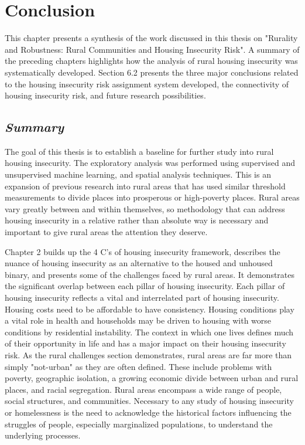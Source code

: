 \chapter{Conclusion}	%

This chapter presents a synthesis of the work discussed in this thesis on "Rurality and Robustness: Rural Communities and Housing Insecurity Risk". A summary of the preceding chapters highlights how the analysis of rural housing insecurity was systematically developed. Section 6.2 presents the three major conclusions related to the housing insecurity risk assignment system developed, the connectivity of housing insecurity risk, and future research possibilities. 

\section{\textit{Summary}}

The goal of this thesis is to establish a baseline for further study into rural housing insecurity. The exploratory analysis was performed using supervised and unsupervised machine learning, and spatial analysis techniques. This is an expansion of previous research into rural areas that has used similar threshold measurements to divide places into prosperous or high-poverty places. Rural areas vary greatly between and within themselves, so methodology that can address housing insecurity in a relative rather than absolute way is necessary and important to give rural areas the attention they deserve. 

Chapter 2 builds up the 4 C's of housing insecurity framework, describes the nuance of housing insecurity as an alternative to the housed and unhoused binary, and presents some of the challenges faced by rural areas. It demonstrates the significant overlap between each pillar of housing insecurity. Each pillar of housing insecurity reflects a vital and interrelated part of housing insecurity. Housing costs need to be affordable to have consistency. Housing conditions play a vital role in health and households may be driven to housing with worse conditions by residential instability. The context in which one lives defines much of their opportunity in life and has a major impact on their housing insecurity risk. As the rural challenges section demonstrates, rural areas are far more than simply "not-urban" as they are often defined. These include problems with poverty, geographic isolation, a growing economic divide between urban and rural places, and racial segregation. Rural areas encompass a wide range of people, social structures, and communities. Necessary to any study of housing insecurity or homelessness is the need to acknowledge the historical factors influencing the struggles of people, especially marginalized populations, to understand the underlying processes. 

